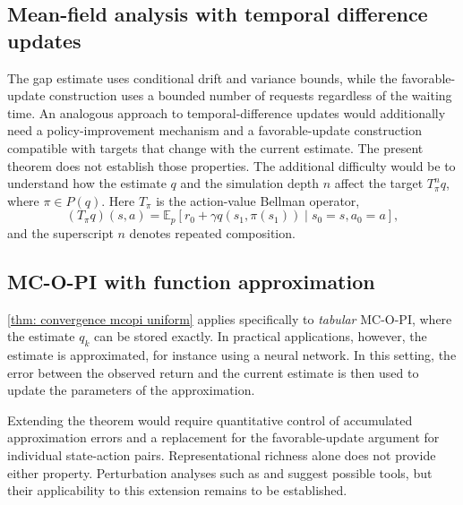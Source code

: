 \subsection{Mean-field analysis with temporal difference updates}
\label{sec: discussion temporal difference}

The gap estimate uses conditional drift and variance bounds, while the favorable-update construction uses a bounded number of requests regardless of the waiting time. An analogous approach to temporal-difference updates would additionally need a policy-improvement mechanism and a favorable-update construction compatible with targets that change with the current estimate. The present theorem does not establish those properties.
The additional difficulty would be to understand how the estimate $q$ and the simulation depth $n$ affect the target $T_{\pi}^n q$, where $\pi \in P(q)$. Here $T_\pi$ is the action-value Bellman operator,
\[
(T_\pi q)(s,a)=\mathbb E_p\!\left[r_0+\gamma q(s_1,\pi(s_1))\mid s_0=s,a_0=a\right],
\]
and the superscript $n$ denotes repeated composition.


\subsection{MC-O-PI with function approximation}
\label{sec: discussion function approximation}

\autoref{thm: convergence mcopi uniform} applies specifically to \textit{tabular} MC-O-PI, where the estimate $q_k$ can be stored exactly.
In practical applications, however, the estimate is approximated, for instance using a neural network.
In this setting, the error between the observed return and the current estimate is then used to update the parameters of the approximation.

Extending the theorem would require quantitative control of accumulated approximation errors and a replacement for the favorable-update argument for individual state-action pairs. Representational richness alone does not provide either property. Perturbation analyses such as \citet[Section~4.3.3]{Bertsekas1996Neuro-DynamicProgramming} and \citet[Section~5.2]{Kushner2003StochasticApplications} suggest possible tools, but their applicability to this extension remains to be established.

